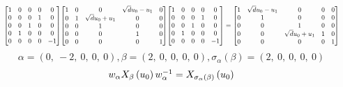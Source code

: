\documentclass[11pt]{article}
\theoremstyle{definition}
\begin{document}
\[
\scaletoalign{\textwidth}{{\left[\begin{matrix}1 & 0 & 0 & 0 & 0\\0 & 0 & 0 & 1 & 0\\0 & 0 & 1 & 0 & 0\\0 & 1 & 0 & 0 & 0\\0 & 0 & 0 & 0 & -1\end{matrix}\right]} {\left[\begin{matrix}1 & 0 & 0 & \sqrt{d} u_{0} - u_{1} & 0\\0 & 1 & \sqrt{d} u_{0} + u_{1} & 0 & 0\\0 & 0 & 1 & 0 & 0\\0 & 0 & 0 & 1 & 0\\0 & 0 & 0 & 0 & 1\end{matrix}\right]} {\left[\begin{matrix}1 & 0 & 0 & 0 & 0\\0 & 0 & 0 & 1 & 0\\0 & 0 & 1 & 0 & 0\\0 & 1 & 0 & 0 & 0\\0 & 0 & 0 & 0 & -1\end{matrix}\right]} = {\left[\begin{matrix}1 & \sqrt{d} u_{0} - u_{1} & 0 & 0 & 0\\0 & 1 & 0 & 0 & 0\\0 & 0 & 1 & 0 & 0\\0 & 0 & \sqrt{d} u_{0} + u_{1} & 1 & 0\\0 & 0 & 0 & 0 & 1\end{matrix}\right]}}
\]
\[
\alpha = \left( 0, \  -2, \  0, \  0, \  0\right), \beta = \left( 2, \  0, \  0, \  0, \  0\right), \sigma_{\alpha}(\beta) = \left( 2, \  0, \  0, \  0, \  0\right)
\]
\[
\scaletoalign{\textwidth}{w_{\alpha} X_{\beta}\left(u_{0}\right) w_{\alpha}^{-1} = X_{\sigma_{\alpha}\left(\beta\right)}\left(u_{0}\right)}
\]
\end{document}

